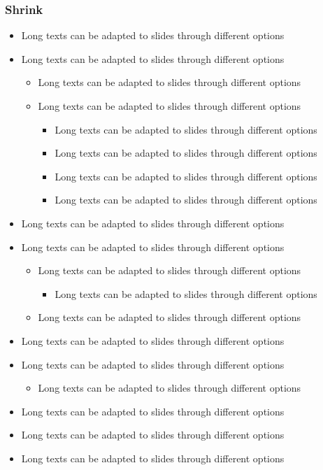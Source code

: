 \documentclass[usepdftitle=false,professionalfonts,compress ]{beamer}
\begin{document}
{
\begin{frame}\frametitle{Shrink}
	\begin{itemize}

		\item Long texts can be adapted to slides through different options
		\item Long texts can be adapted to slides through different options
		\begin{itemize}

			\item Long texts can be adapted to slides through different options
			\item Long texts can be adapted to slides through different options
			\begin{itemize}

				\item Long texts can be adapted to slides through different options
				\item Long texts can be adapted to slides through different options
				\item Long texts can be adapted to slides through different options
				\item Long texts can be adapted to slides through different options
			\end{itemize}
		\end{itemize}
		\item Long texts can be adapted to slides through different options
		\item Long texts can be adapted to slides through different options
		\begin{itemize}

			\item Long texts can be adapted to slides through different options
			\begin{itemize}

				\item Long texts can be adapted to slides through different options
			\end{itemize}
			\item Long texts can be adapted to slides through different options
		\end{itemize}
		\item Long texts can be adapted to slides through different options
		\item Long texts can be adapted to slides through different options
		\begin{itemize}

			\item Long texts can be adapted to slides through different options
		\end{itemize}
		\item Long texts can be adapted to slides through different options
		\item Long texts can be adapted to slides through different options
		\item Long texts can be adapted to slides through different options
		\begin{itemize}


\end{itemize}
\end{itemize}
\end{frame}}
\end{document}
